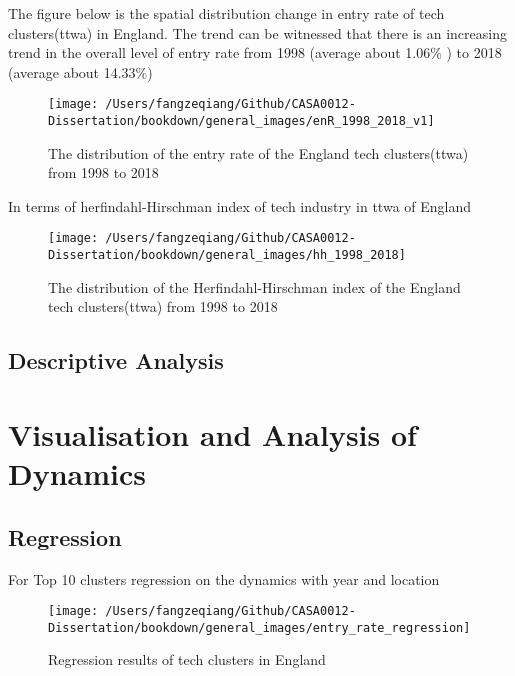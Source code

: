 \documentclass[
  12pt,
  oneside]{book}
\begin{document}
The figure below is the spatial distribution change in entry rate of tech clusters(ttwa) in England. The trend can be witnessed that there is an increasing trend in the overall level of entry rate from 1998 (average about 1.06\% ) to 2018
(average about 14.33\%)

\begin{figure}
\texttt{[image: /Users/fangzeqiang/Github/CASA0012-Dissertation/bookdown/general\_images/enR\_1998\_2018\_v1]} \caption{The distribution of the entry rate of the England tech clusters(ttwa) from 1998 to 2018}\label{fig:fig-enR-1998-2018-v1}
\end{figure}

In terms of herfindahl-Hirschman index of tech industry in ttwa of England

\begin{figure}
\texttt{[image: /Users/fangzeqiang/Github/CASA0012-Dissertation/bookdown/general\_images/hh\_1998\_2018]} \caption{The distribution of the Herfindahl-Hirschman index of the England tech clusters(ttwa) from 1998 to 2018}\label{fig:fig-hh-1998-2018}
\end{figure}

\hypertarget{descriptive-analysis}{%
\subsection{Descriptive Analysis}\label{descriptive-analysis}}

\hypertarget{visualisation-and-analysis-of-dynamics}{%
\section{Visualisation and Analysis of Dynamics}\label{visualisation-and-analysis-of-dynamics}}

\hypertarget{regression}{%
\subsection{Regression}\label{regression}}

For Top 10 clusters regression on the dynamics with year and location

\begin{figure}
\texttt{[image: /Users/fangzeqiang/Github/CASA0012-Dissertation/bookdown/general\_images/entry\_rate\_regression]} \caption{Regression results of tech clusters in England}\label{fig:fig-regression-entry-rate}
\end{figure}
\end{document}
